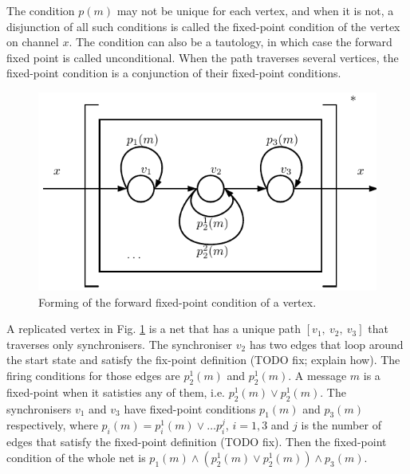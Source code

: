The condition $p(m)$ may not be unique for each vertex, and when it is not, a disjunction of all such conditions is called the fixed-point condition of the vertex on channel $x$. The condition can also be a tautology, in which case the forward fixed point is called unconditional. When the path traverses several vertices, the fixed-point condition is a conjunction of their fixed-point conditions.

  \begin{figure}[h!]
  \centering
  \includegraphics{figs/chapter_04_ffp.pdf}
  \caption{Forming of the forward fixed-point condition of a vertex.}
  \label{fig:ffp}
  \end{figure}

A replicated vertex in Fig. \ref{fig:ffp} is a net that has a unique path $[v_1, \: v_2, \: v_3]$ that traverses only synchronisers. The synchroniser $v_2$ has two edges that loop around the start state and satisfy the fix-point definition (TODO fix; explain how). The firing conditions for those edges are $p^{1}_2(m)$ and $p^{1}_2(m)$. A message $m$ is a fixed-point when it satisties any of them, i.e. $p^{1}_2(m) \lor p^{1}_2(m)$. The synchronisers $v_1$ and $v_3$ have fixed-point conditions $p_1(m)$ and $p_3(m)$ respectively, where $p_i(m) = p^{1}_i(m) \lor \dots p^{j}_i$, $i=1,3$ and $j$ is the number of edges that satisfy the fixed-point definition (TODO fix). Then the fixed-point condition of the whole net is $p_1(m) \land (p^{1}_2(m) \lor p^{1}_2(m)) \land p_3(m)$.




